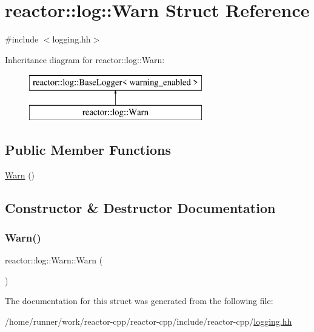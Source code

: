 \hypertarget{structreactor_1_1log_1_1Warn}{}\section{reactor\+:\+:log\+:\+:Warn Struct Reference}
\label{structreactor_1_1log_1_1Warn}


{\ttfamily \#include $<$logging.\+hh$>$}

Inheritance diagram for reactor\+:\+:log\+:\+:Warn\+:\begin{figure}[H]
\begin{center}
\leavevmode
\includegraphics[height=2.000000cm]{structreactor_1_1log_1_1Warn}
\end{center}
\end{figure}
\subsection*{Public Member Functions}
\begin{DoxyCompactItemize}
\item 
\hyperlink{structreactor_1_1log_1_1Warn_ae5618a1eaf8cd1791073c364410152a8}{Warn} ()
\end{DoxyCompactItemize}


\subsection{Constructor \& Destructor Documentation}
\mbox{\label{structreactor_1_1log_1_1Warn_ae5618a1eaf8cd1791073c364410152a8}} 
\subsubsection{\texorpdfstring{Warn()}{Warn()}}
{\footnotesize\ttfamily reactor\+::log\+::\+Warn\+::\+Warn (\begin{DoxyParamCaption}{ }\end{DoxyParamCaption})\hspace{0.3cm}{\ttfamily [inline]}}



The documentation for this struct was generated from the following file\+:\begin{DoxyCompactItemize}
\item 
/home/runner/work/reactor-\/cpp/reactor-\/cpp/include/reactor-\/cpp/\hyperlink{logging_8hh}{logging.\+hh}\end{DoxyCompactItemize}
